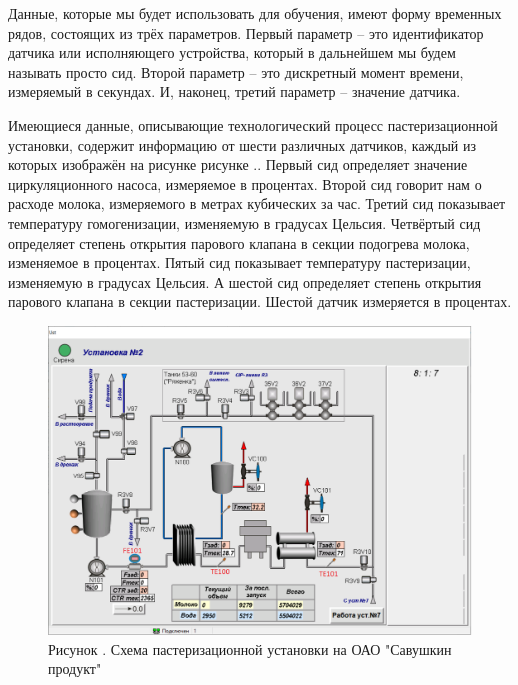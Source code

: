 {\gostFont

  \par \redline Данные, которые мы будет использовать для обучения, имеют форму временных рядов, состоящих из трёх параметров. Первый параметр {--} это идентификатор датчика или исполняющего устройства, который в дальнейшем мы будем называть просто сид. Второй параметр {--} это дискретный момент времени, измеряемый в секундах. И, наконец, третий параметр {--} значение датчика. 

  \par \redline Имеющиеся данные, описывающие технологический процесс пастеризационной установки, содержит информацию от шести различных датчиков, каждый из которых изображён на рисунке рисунке \thechaptercntr .\theimagecntr . Первый сид определяет значение циркуляционного насоса, измеряемое в процентах. Второй сид говорит нам о расходе молока, измеряемого в метрах кубических за час. Третий сид показывает температуру гомогенизации, изменяемую в градусах Цельсия. Четвёртый сид определяет степень открытия парового клапана в секции подогрева молока, изменяемое в процентах. Пятый сид показывает температуру пастеризации, изменяемую в градусах Цельсия. А шестой сид определяет степень открытия парового клапана в секции пастеризации. Шестой датчик измеряется в процентах.

  \begin{figure}
    \centering
    \def\svgwidth{\textwidth}
    \includegraphics[width=\textwidth]{images/paster.png}
    \caption*{\gostFont Рисунок \thechaptercntr .\theimagecntr \spc {--} Схема пастеризационной установки на ОАО "Савушкин продукт"}
    \label{fig:NNBlackBox}
  \end{figure} \addtocounter{imagecntr}{1}

}
